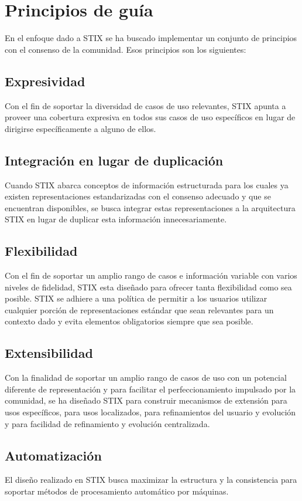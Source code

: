 \section{Principios de guía}
En el enfoque dado a STIX se ha buscado implementar un conjunto de principios 
con el consenso de la comunidad. Esos principios son los siguientes:
\subsection{Expresividad}
Con el fin de soportar la diversidad de casos de uso relevantes, STIX apunta a 
proveer una cobertura expresiva en todos sus casos de uso específicos en lugar 
de dirigirse específicamente a alguno de ellos.
\subsection{Integración en lugar de duplicación}
Cuando STIX abarca conceptos de información estructurada para los cuales ya 
existen representaciones estandarizadas con el consenso adecuado y que se 
encuentran disponibles, se busca integrar estas representaciones a la 
arquitectura STIX en lugar de duplicar esta información innecesariamente.
\subsection{Flexibilidad}
Con el fin de soportar un amplio rango de casos e información variable con 
varios niveles de fidelidad, STIX esta diseñado para ofrecer tanta flexibilidad 
como sea posible. STIX se adhiere a una política de permitir a los usuarios 
utilizar cualquier porción de representaciones estándar que sean relevantes para 
un contexto dado y evita elementos obligatorios siempre que sea posible.

\subsection{Extensibilidad}
Con la finalidad de soportar un amplio rango de casos de uso con un potencial 
diferente de representación y para facilitar el perfeccionamiento 
impulsado por la comunidad, se ha diseñado STIX para construir mecanismos de 
extensión para usos específicos, para usos localizados, para refinamientos del 
usuario y evolución y para facilidad de refinamiento y evolución centralizada.

\subsection{Automatización}
El diseño realizado en STIX busca maximizar la estructura y la consistencia para 
soportar métodos de procesamiento automático por máquinas.

